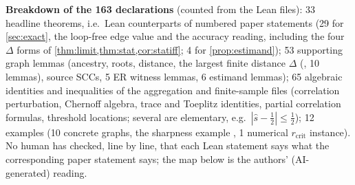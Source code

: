\textbf{Breakdown of the 163 declarations} (counted from the Lean files):
33 headline theorems, i.e.\ Lean counterparts of numbered paper statements
(29 for \cref{sec:exact}, the loop-free edge value and the accuracy reading,
including the four $\Delta$ forms of \cref{thm:limit,thm:stat,cor:statiff}; 4
for \cref{prop:estimand}); 53 supporting graph lemmas (ancestry, roots, distance,
the largest finite distance $\Delta$ (, 10 lemmas), source SCCs,
5 ER witness lemmas, 6 estimand lemmas); 65 algebraic identities
and inequalities of the aggregation and finite-sample files (correlation
perturbation, Chernoff algebra, trace and Toeplitz identities, partial
correlation formulas, threshold locations; several are elementary, e.g.\
$|\hat s-\tfrac12|\le\tfrac12$); 12 examples (10 concrete graphs, the sharpness
example \lname{edgeLoops_burn_sharp}, 1 numerical $r_{\mathrm{crit}}$ instance).
No human has checked, line by line, that each Lean statement says what the
corresponding paper statement says; the map below is the authors' (AI-generated)
reading.

